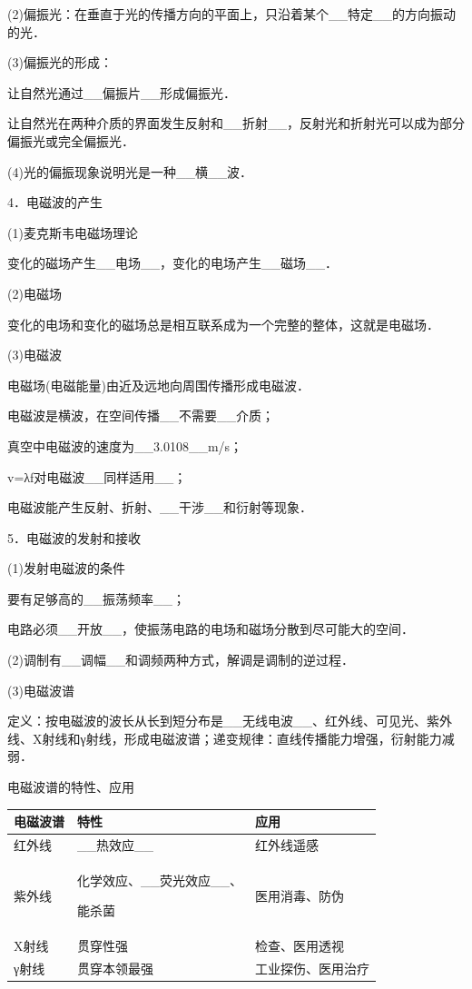 (2)偏振光：在垂直于光的传播方向的平面上，只沿着某个\_\_特定\_\_的方向振动的光．

(3)偏振光的形成：

让自然光通过\_\_偏振片\_\_形成偏振光．

让自然光在两种介质的界面发生反射和\_\_折射\_\_，反射光和折射光可以成为部分偏振光或完全偏振光．

(4)光的偏振现象说明光是一种\_\_横\_\_波．

4．电磁波的产生

(1)麦克斯韦电磁场理论

变化的磁场产生\_\_电场\_\_，变化的电场产生\_\_磁场\_\_．

(2)电磁场

变化的电场和变化的磁场总是相互联系成为一个完整的整体，这就是电磁场．

(3)电磁波

电磁场(电磁能量)由近及远地向周围传播形成电磁波．

电磁波是横波，在空间传播\_\_不需要\_\_介质；

真空中电磁波的速度为\_\_3.0108\_\_m/s；

v=λf对电磁波\_\_同样适用\_\_；

电磁波能产生反射、折射、\_\_干涉\_\_和衍射等现象．

5．电磁波的发射和接收

(1)发射电磁波的条件

要有足够高的\_\_振荡频率\_\_；

电路必须\_\_开放\_\_，使振荡电路的电场和磁场分散到尽可能大的空间．

(2)调制有\_\_调幅\_\_和调频两种方式，解调是调制的逆过程．

(3)电磁波谱

定义：按电磁波的波长从长到短分布是\_\_无线电波\_\_、红外线、可见光、紫外线、X射线和γ射线，形成电磁波谱；递变规律：直线传播能力增强，衍射能力减弱．

电磁波谱的特性、应用

\begin{longtable}[]{@{}lll@{}}
\toprule
电磁波谱 & 特性 & 应用\tabularnewline
\midrule
\endhead
红外线 & \_\_热效应\_\_ & 红外线遥感\tabularnewline
\begin{minipage}[t]{0.30\columnwidth}\raggedright
紫外线\strut
\end{minipage} & \begin{minipage}[t]{0.30\columnwidth}\raggedright
化学效应、\_\_荧光效应\_\_、

能杀菌\strut
\end{minipage} & \begin{minipage}[t]{0.30\columnwidth}\raggedright
医用消毒、防伪\strut
\end{minipage}\tabularnewline
X射线 & 贯穿性强 & 检查、医用透视\tabularnewline
γ射线 & 贯穿本领最强 & 工业探伤、医用治疗\tabularnewline
\bottomrule
\end{longtable}

